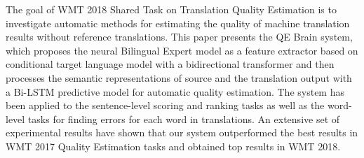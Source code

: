 The goal of WMT 2018 Shared Task on Translation Quality Estimation is to investigate automatic methods for estimating the quality of machine translation results without reference translations. This paper presents the QE Brain system, which proposes the neural Bilingual Expert model as a feature extractor based on conditional target language model with a bidirectional transformer and then processes the semantic representations of source and the translation output with a Bi-LSTM predictive model for automatic quality estimation.  The system has been applied to the sentence-level scoring and ranking tasks as well as the word-level tasks for finding errors for each word in translations. An extensive set of experimental results have shown that our system outperformed the best results in WMT 2017 Quality Estimation tasks and obtained top results in WMT 2018.
